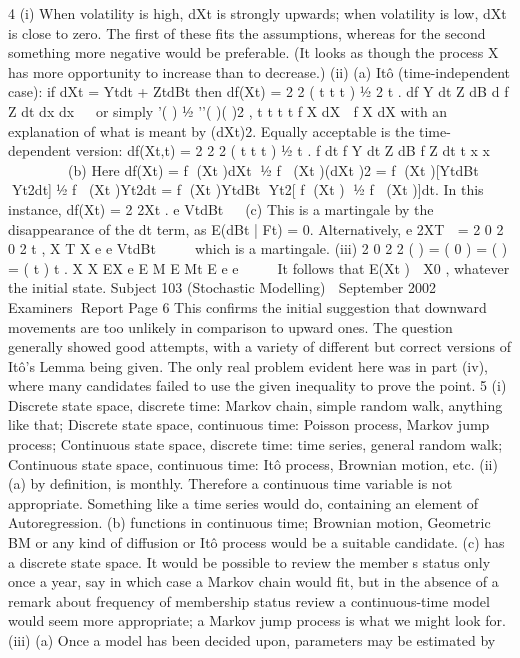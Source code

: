 4 (i) When volatility is high, dXt is strongly upwards; when volatility is low, dXt is
close to zero.
The first of these fits the assumptions, whereas for the second something more
negative would be preferable. (It looks as though the process X has more
opportunity to increase than to decrease.)
(ii) (a) Itô (time-independent case): if dXt = Ytdt + ZtdBt then
df(Xt) =
2
2
( t t t ) ½ 2 t .
df Y dt Z dB d f Z dt
dx dx
  or simply
’( ) ½ ’’( )( )2 , t t t t f X dX  f X dX with an explanation of what is meant by (dXt)2.
Equally acceptable is the time-dependent version:
df(Xt,t) =
2
2
2 ( t t t ) ½ t .
f dt f Y dt Z dB f Z dt
t x x
  
  
  
(b) Here
df(Xt) = f (Xt )dXt ½ f (Xt )(dXt )2
= f (Xt )[YtdBt Yt2dt]½ f (Xt )Yt2dt
= f (Xt )YtdBt Yt2[ f (Xt ) ½ f (Xt )]dt.
In this instance, df(Xt) = 2 2Xt .
e VtdBt 

(c) This is a martingale by the disappearance of the dt term, as E(dBt | Ft) = 0.
Alternatively,
e 2XT  = 2 0 2
0
2 t ,
X T X
e e VtdBt  
 
which is a martingale.
(iii) 2 0 2 2 ( )
= ( 0 ) = ( ) = ( t ) t . X X EX
e E M E Mt E e e     It follows that E(Xt )  X0 ,
whatever the initial state.
Subject 103 (Stochastic Modelling)  September 2002  Examiners Report
Page 6
This confirms the initial suggestion that downward movements are too
unlikely in comparison to upward ones.
The question generally showed good attempts, with a variety of different but correct versions
of Itô’s Lemma being given. The only real problem evident here was in part (iv), where many
candidates failed to use the given inequality to prove the point.
5 (i) Discrete state space, discrete time: Markov chain, simple random walk,
anything like that;
Discrete state space, continuous time: Poisson process, Markov jump process;
Continuous state space, discrete time: time series, general random walk;
Continuous state space, continuous time: Itô process, Brownian motion, etc.
(ii) (a) by definition, is monthly. Therefore a continuous time variable is not
appropriate. Something like a time series would do, containing an element of
Autoregression.
(b) functions in continuous time; Brownian motion, Geometric BM or any
kind of diffusion or Itô process would be a suitable candidate.
(c) has a discrete state space. It would be possible to review the members
status only once a year, say in which case a Markov chain would fit, but in the
absence of a remark about frequency of membership status review a
continuous-time model would seem more appropriate; a Markov jump process
is what we might look for.
(iii) (a) Once a model has been decided upon, parameters may be estimated by
